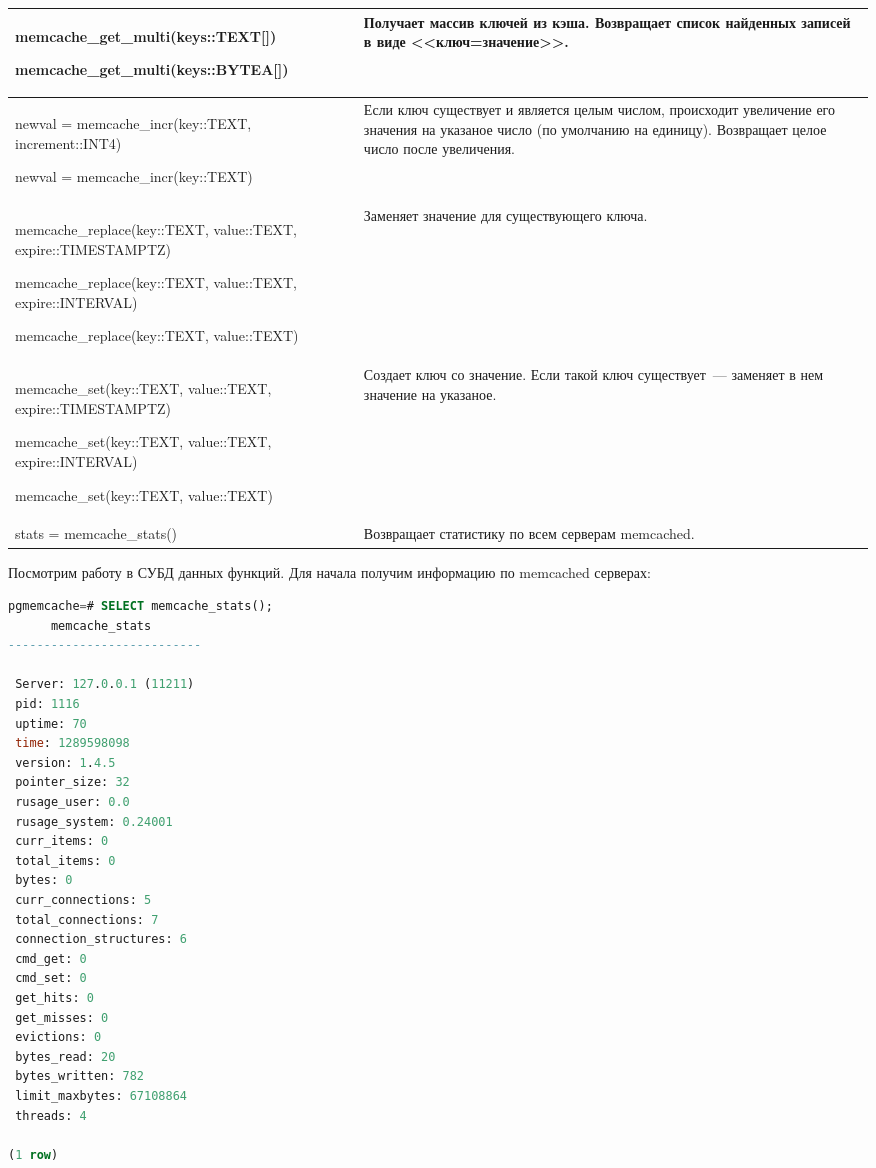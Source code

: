 \begin{table}[h]
\begin{tabular}{| >{\raggedright\scriptsize}p{7cm}| >{\scriptsize}p{7cm} |}
memcache\_get\_multi(keys::TEXT[])

memcache\_get\_multi(keys::BYTEA[])

&
Получает массив ключей из кэша.
Возвращает список найденных записей в виде <<ключ=значение>>.\\

\hline

newval = memcache\_incr(key::TEXT, increment::INT4)

newval = memcache\_incr(key::TEXT)

&
Если ключ существует и является целым числом, происходит увеличение
его значения на указаное число (по умолчанию на единицу).
Возвращает целое число после увеличения.\\

\hline

memcache\_replace(key::TEXT, value::TEXT, expire::TIMESTAMPTZ)

memcache\_replace(key::TEXT, value::TEXT, expire::INTERVAL)

memcache\_replace(key::TEXT, value::TEXT)

&
Заменяет значение для существующего ключа.\\

\hline

memcache\_set(key::TEXT, value::TEXT, expire::TIMESTAMPTZ)

memcache\_set(key::TEXT, value::TEXT, expire::INTERVAL)

memcache\_set(key::TEXT, value::TEXT)

&
Создает ключ со значение. Если такой ключ существует~--- заменяет в нем значение на указаное.\\

\hline

stats = memcache\_stats()

&
Возвращает статистику по всем серверам memcached.\\

\hline
\end{tabular}
\end{table}

Посмотрим работу в СУБД данных функций. Для начала получим информацию по memcached серверах:

\begin{lstlisting}[language=SQL,label=lst:pgcache8,caption=Проверка memcache\_stats]
pgmemcache=# SELECT memcache_stats();
      memcache_stats
---------------------------

 Server: 127.0.0.1 (11211)
 pid: 1116
 uptime: 70
 time: 1289598098
 version: 1.4.5
 pointer_size: 32
 rusage_user: 0.0
 rusage_system: 0.24001
 curr_items: 0
 total_items: 0
 bytes: 0
 curr_connections: 5
 total_connections: 7
 connection_structures: 6
 cmd_get: 0
 cmd_set: 0
 get_hits: 0
 get_misses: 0
 evictions: 0
 bytes_read: 20
 bytes_written: 782
 limit_maxbytes: 67108864
 threads: 4

(1 row)
\end{lstlisting}


